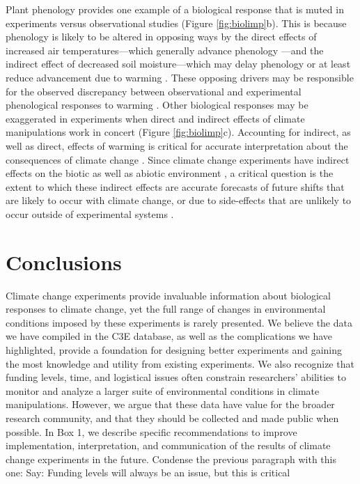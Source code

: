 \documentclass{article}
\begin{document}
\par Plant phenology provides one example of a biological response that is muted in experiments versus observational studies (Figure \ref{fig:biolimp}b). This is because phenology is likely to be altered in opposing ways by the direct effects of increased air temperatures---which generally advance phenology \citep{wolkovich2012}---and the indirect effect of decreased soil moisture---which may delay phenology or at least reduce advancement due to warming \citep{penuelas2004,ourcival2011,craine2012,matthews2016}. 
These opposing drivers may be responsible for the observed discrepancy between observational and experimental phenological responses to warming \citep{wolkovich2012}. Other biological responses may be exaggerated in experiments when direct and indirect effects of climate manipulations work in concert (Figure \ref{fig:biolimp}c). Accounting for indirect, as well as direct, effects of warming is critical for accurate interpretation about the consequences of climate change \citep{kharouba2015}. Since climate change experiments have indirect effects on the biotic as well as abiotic environment \citep{hoeppner2012,pelini2014,diamond2016}, a critical question is the extent to which these indirect effects are accurate forecasts of future shifts that are likely to occur with climate change, or due to side-effects that are unlikely to occur outside of experimental systems \citep{moise2010,diamond2013}.
\section* {Conclusions}
 \par Climate change experiments provide invaluable information about biological responses to climate change, yet the full range of changes in environmental conditions imposed by these experiments is rarely presented. We believe the data we have compiled in the C3E database, as well as the complications we have highlighted, provide a foundation for designing better experiments and gaining the most knowledge and utility from existing experiments. We also recognize that funding levels, time, and logistical issues often constrain researchers' abilities to monitor and analyze a larger suite of environmental conditions in climate manipulations. However, we argue that these data have value for the broader research community, and that they should be collected and made public when possible. In Box 1, we describe specific recommendations to improve implementation, interpretation, and communication of the results of climate change experiments in the future. %
Condense the previous paragraph with this one:
Say: Funding levels will always be an issue, but this is critical
 
\end{document}

